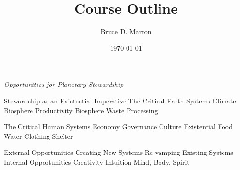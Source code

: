 \documentclass[12pt, letterpaper]{article}
\title{\vspace{-15mm}\fontsize{14pt}{10pt}
                    \selectfont \textbf{Course Outline}   %
                    \vspace{-7mm}
      }
\author{
     \normalsize Bruce D. Marron \\                     %
     \vspace{-5mm}
}
\date{\normalsize \today}
\begin{document}
\begin{singlespacing}
\end{singlespacing}
\thispagestyle{fancy}                           %



\large
\begin{flushleft}
\textit{Opportunities for Planetary Stewardship}
\end{flushleft}

\normalsize

\begin{outline}[enumerate]
\1 Stewardship as an Existential Imperative
\1 The Critical Earth Systems
\2 Climate
\2 Biosphere Productivity 
\2 Biosphere Waste Processing

\1 The Critical Human Systems
\2 Economy
\2 Governance
\2 Culture
\2 Existential
\3 Food
\3 Water
\3 Clothing
\3 Shelter

\1 External Opportunities
\2 Creating New Systems
\2 Re-vamping Existing Systems
\
\1 Internal Opportunities
\2 Creativity
\2 Intuition
\2 Mind, Body, Spirit
\end{outline}





\clearpage 
\renewcommand{\thepage}{}
\printbibliography
\end{document}
